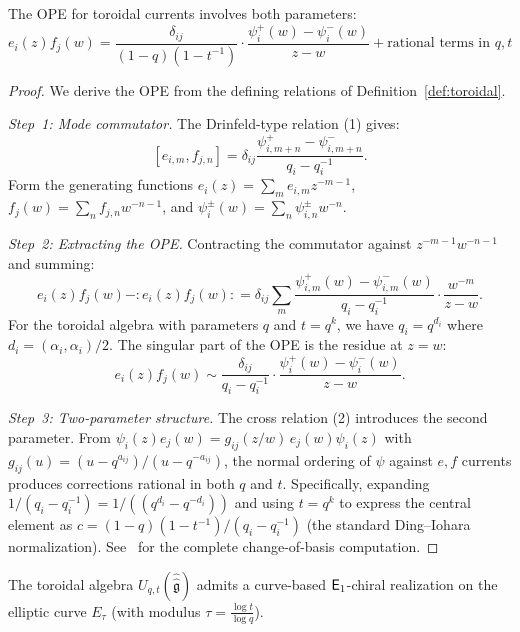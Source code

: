 \begin{proposition}\label{prop:toroidal-ope}
The OPE for toroidal currents involves both parameters:
\[
e_i(z) f_j(w) = \frac{\delta_{ij}}{(1 - q)(1 - t^{-1})} \cdot
\frac{\psi_i^+(w) - \psi_i^-(w)}{z - w} + \text{rational terms in } q, t
\]
\end{proposition}

\begin{proof}
We derive the OPE from the defining relations of Definition~\ref{def:toroidal}.

\emph{Step~1: Mode commutator.}
The Drinfeld-type relation (1) gives:
\[
[e_{i,m}, f_{j,n}] = \delta_{ij} \frac{\psi^+_{i,m+n} - \psi^-_{i,m+n}}{q_i - q_i^{-1}}.
\]
Form the generating functions $e_i(z) = \sum_m e_{i,m} z^{-m-1}$,
$f_j(w) = \sum_n f_{j,n} w^{-n-1}$, and
$\psi_i^\pm(w) = \sum_n \psi^\pm_{i,n} w^{-n}$.

\emph{Step~2: Extracting the OPE.}
Contracting the commutator against $z^{-m-1} w^{-n-1}$ and summing:
\[
e_i(z) f_j(w) - {:}e_i(z) f_j(w){:}
= \delta_{ij} \sum_{m} \frac{\psi^+_{i,m}(w) - \psi^-_{i,m}(w)}{q_i - q_i^{-1}} \cdot \frac{w^{-m}}{z - w}.
\]
For the toroidal algebra with parameters $q$ and $t = q^k$,
we have $q_i = q^{d_i}$ where $d_i = (\alpha_i, \alpha_i)/2$.
The singular part of the OPE is the residue at $z = w$:
\[
e_i(z) f_j(w) \sim \frac{\delta_{ij}}{q_i - q_i^{-1}} \cdot
\frac{\psi_i^+(w) - \psi_i^-(w)}{z - w}.
\]

\emph{Step~3: Two-parameter structure.}
The cross relation (2) introduces the second parameter.
From $\psi_i(z) e_j(w) = g_{ij}(z/w) \, e_j(w) \psi_i(z)$
with $g_{ij}(u) = (u - q^{a_{ij}})/(u - q^{-a_{ij}})$,
the normal ordering of $\psi$ against $e, f$ currents produces
corrections rational in both $q$ and $t$.  Specifically, expanding
$1/(q_i - q_i^{-1}) = 1/((q^{d_i} - q^{-d_i}))$ and using
$t = q^k$ to express the central element as
$c = (1 - q)(1-t^{-1})/(q_i - q_i^{-1})$ (the standard Ding--Iohara
normalization).  See~\cite{DI97} for the complete change-of-basis computation.
\end{proof}

\begin{conjecture}\label{conj:toroidal-e1}
The toroidal algebra $U_{q,t}(\hat{\hat{\mathfrak{g}}})$ admits a
curve-based $\mathsf{E}_1$-chiral realization on the elliptic curve
$E_\tau$ (with modulus $\tau = \frac{\log t}{\log q}$).
\end{conjecture}

